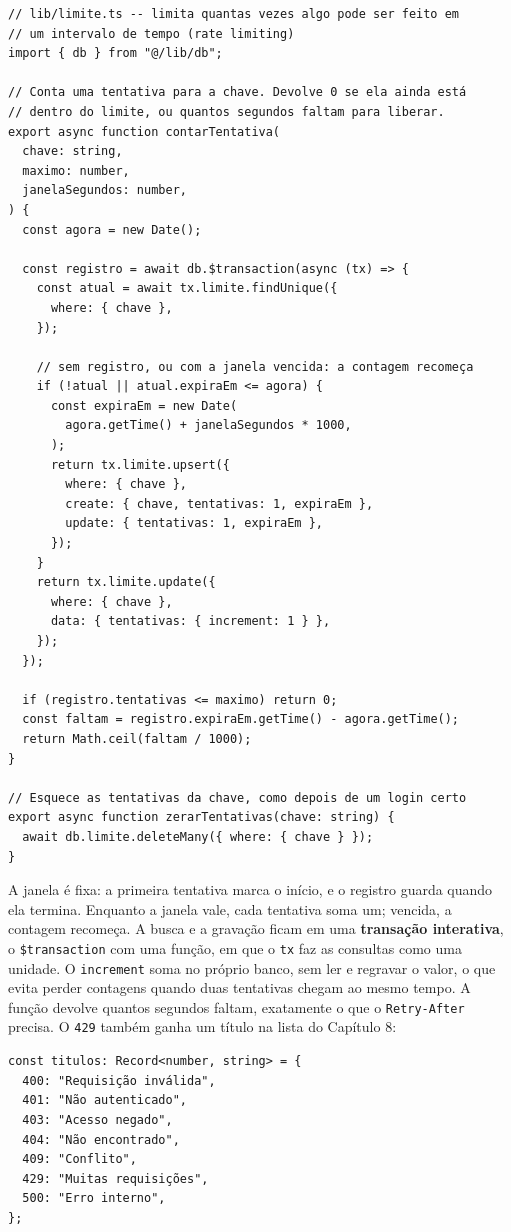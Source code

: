 \begin{codigo}
\begin{Verbatim}[breaklines=true, breaksymbolleft={}, fontsize=\footnotesize]
// lib/limite.ts -- limita quantas vezes algo pode ser feito em
// um intervalo de tempo (rate limiting)
import { db } from "@/lib/db";

// Conta uma tentativa para a chave. Devolve 0 se ela ainda está
// dentro do limite, ou quantos segundos faltam para liberar.
export async function contarTentativa(
  chave: string,
  maximo: number,
  janelaSegundos: number,
) {
  const agora = new Date();

  const registro = await db.$transaction(async (tx) => {
    const atual = await tx.limite.findUnique({
      where: { chave },
    });

    // sem registro, ou com a janela vencida: a contagem recomeça
    if (!atual || atual.expiraEm <= agora) {
      const expiraEm = new Date(
        agora.getTime() + janelaSegundos * 1000,
      );
      return tx.limite.upsert({
        where: { chave },
        create: { chave, tentativas: 1, expiraEm },
        update: { tentativas: 1, expiraEm },
      });
    }
    return tx.limite.update({
      where: { chave },
      data: { tentativas: { increment: 1 } },
    });
  });

  if (registro.tentativas <= maximo) return 0;
  const faltam = registro.expiraEm.getTime() - agora.getTime();
  return Math.ceil(faltam / 1000);
}

// Esquece as tentativas da chave, como depois de um login certo
export async function zerarTentativas(chave: string) {
  await db.limite.deleteMany({ where: { chave } });
}
\end{Verbatim}
\end{codigo}

A janela é fixa: a primeira tentativa marca o início, e o registro guarda quando ela termina. Enquanto a janela vale, cada tentativa soma um; vencida, a contagem recomeça. A busca e a gravação ficam em uma \textbf{transação interativa}, o \texttt{\$transaction} com uma função, em que o \texttt{tx} faz as consultas como uma unidade. O \texttt{increment} soma no próprio banco, sem ler e regravar o valor, o que evita perder contagens quando duas tentativas chegam ao mesmo tempo. A função devolve quantos segundos faltam, exatamente o que o \texttt{Retry-After} precisa. O \texttt{429} também ganha um título na lista do Capítulo 8:

\begin{codigo}
\begin{Verbatim}[breaklines=true, breaksymbolleft={}, fontsize=\footnotesize]
const titulos: Record<number, string> = {
  400: "Requisição inválida",
  401: "Não autenticado",
  403: "Acesso negado",
  404: "Não encontrado",
  409: "Conflito",
  429: "Muitas requisições",
  500: "Erro interno",
};
\end{Verbatim}
\end{codigo}

